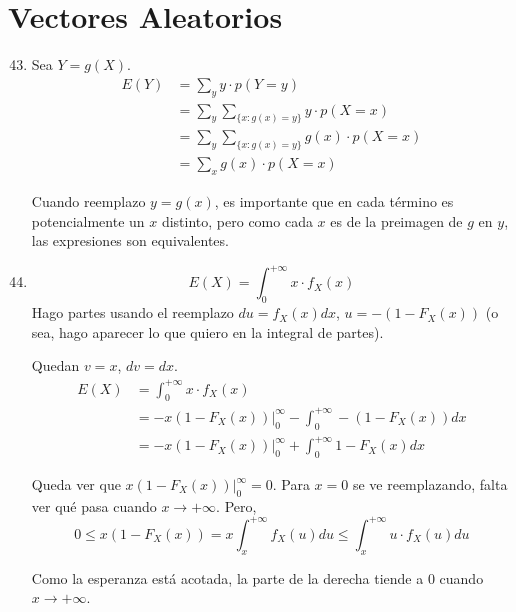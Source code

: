\section{Vectores Aleatorios}
\begin{enumerate}
	\setcounter{enumi}{42}
	\item
		Sea $Y = g(X)$.
		\begin{align*}
			E(Y)	& = \sum_{y} y\cdot p(Y=y)								\\
					& = \sum_{y} \sum_{\{x : g(x) = y\}} y\cdot p(X=x)		\\
					& = \sum_{y} \sum_{\{x : g(x) = y\}} g(x)\cdot p(X=x)	\\
					& = \sum_{x} g(x)\cdot p(X=x)
		\end{align*}
		
		Cuando reemplazo $y=g(x)$, es importante que en cada término es potencialmente un $x$ distinto,
		pero como cada $x$ es de la preimagen de $g$ en $y$, las expresiones son equivalentes.
		
	\item
		$$E(X) = \int_0^{+\infty} x\cdot f_X(x)$$
		Hago partes usando el reemplazo $du = f_X(x)dx$, $u = -(1 - F_X(x))$ (o sea, hago aparecer lo que quiero en la integral de partes).
		
		Quedan $v = x$, $dv = dx$.
		\begin{align*}
			E(X)	& = \int_0^{+\infty} x\cdot f_X(x)	\\
					& = -x(1-F_X(x))\Big|_0^\infty - \int_0^{+\infty} -(1 - F_X(x))dx	\\
					& = -x(1-F_X(x))\Big|_0^\infty + \int_0^{+\infty} 1 - F_X(x)dx
		\end{align*}
		
		Queda ver que $x(1-F_X(x))\big|_0^\infty = 0$. Para $x=0$ se ve reemplazando, falta ver qué pasa cuando $x\rightarrow +\infty$.
		Pero,
		$$0 \leq x(1-F_X(x)) = x\int_x^{+\infty}f_X(u)du \leq \int_x^{+\infty}u\cdot f_X(u)du$$
		
		Como la esperanza está acotada, la parte de la derecha tiende a $0$ cuando $x\rightarrow +\infty$.

\end{enumerate}
